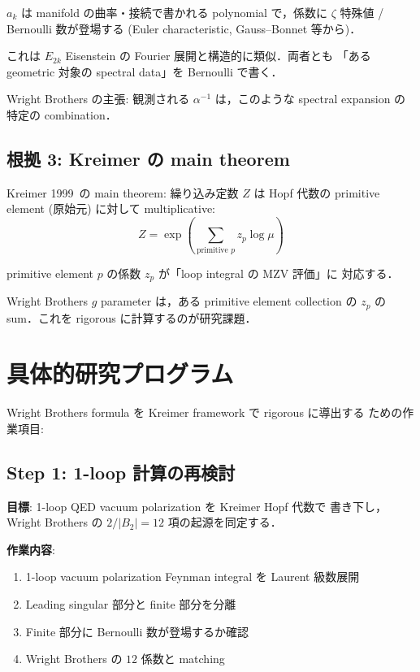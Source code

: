 \documentclass[11pt,a4paper]{article}
\begin{document}
$a_k$ は manifold の曲率・接続で書かれる polynomial で，係数に
$\zeta$ 特殊値 / Bernoulli 数が登場する (Euler characteristic,
Gauss--Bonnet 等から)．

これは $E_{2k}$ Eisenstein の Fourier 展開と構造的に類似．両者とも
「ある geometric 対象の spectral data」を Bernoulli で書く．

Wright Brothers の主張: 観測される $\alpha^{-1}$ は，このような
spectral expansion の特定の combination．

\subsection{根拠 3: Kreimer の main theorem}

Kreimer 1999~\cite{Kreimer1999}の main theorem: 繰り込み定数 $Z$ は
Hopf 代数の primitive element (原始元) に対して multiplicative:
\begin{equation}
Z = \exp\left(\sum_{\text{primitive } p} z_p \log\mu\right)
\end{equation}

primitive element $p$ の係数 $z_p$ が「loop integral の MZV 評価」に
対応する．

Wright Brothers $g$ parameter は，ある primitive element collection の
$z_p$ の sum．これを rigorous に計算するのが研究課題．

\section{具体的研究プログラム}

Wright Brothers formula を Kreimer framework で rigorous に導出する
ための作業項目:

\subsection{Step 1: 1-loop 計算の再検討}

\textbf{目標}: 1-loop QED vacuum polarization を Kreimer Hopf 代数で
書き下し，Wright Brothers の $2/|B_2| = 12$ 項の起源を同定する．

\textbf{作業内容}:
\begin{enumerate}
\item 1-loop vacuum polarization Feynman integral を Laurent 級数展開
\item Leading singular 部分と finite 部分を分離
\item Finite 部分に Bernoulli 数が登場するか確認
\item Wright Brothers の $12$ 係数と matching
\end{enumerate}
\end{document}
